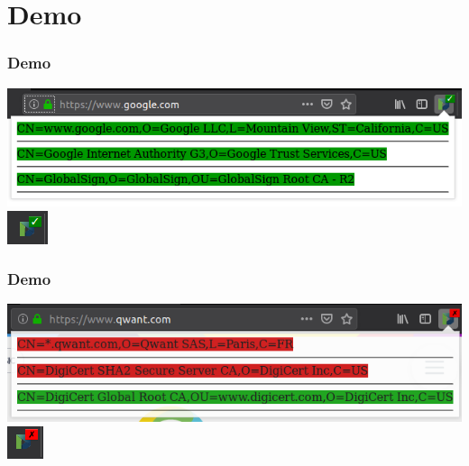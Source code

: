 \section[Demonstration]{Demo}

\begin{frame}
	\frametitle{Demo}
	\begin{center}
		\includegraphics[scale=0.4]{figs/green_certs.png}
		\includegraphics{figs/green_tick.png}
	\end{center}
\end{frame}

\begin{frame}
	\frametitle{Demo}
	\begin{center}
		\includegraphics[scale=0.4]{figs/red_certs.png}
		\includegraphics{figs/red_mark.png}
	\end{center}
\end{frame}